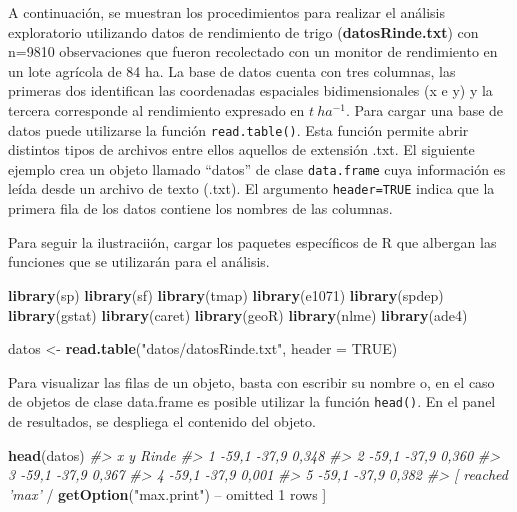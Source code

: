 \documentclass[11pt,b5paper,]{krantz}
\newenvironment{Shaded}{}{}
\newcommand{\CommentTok}[1]{\textcolor[rgb]{0.38,0.63,0.69}{\textit{#1}}}
\newcommand{\DataTypeTok}[1]{\textcolor[rgb]{0.56,0.13,0.00}{#1}}
\newcommand{\DecValTok}[1]{\textcolor[rgb]{0.25,0.63,0.44}{#1}}
\newcommand{\KeywordTok}[1]{\textcolor[rgb]{0.00,0.44,0.13}{\textbf{#1}}}
\newcommand{\NormalTok}[1]{#1}
\newcommand{\OperatorTok}[1]{\textcolor[rgb]{0.40,0.40,0.40}{#1}}
\newcommand{\OtherTok}[1]{\textcolor[rgb]{0.00,0.44,0.13}{#1}}
\newcommand{\StringTok}[1]{\textcolor[rgb]{0.25,0.44,0.63}{#1}}
\begin{document}
A continuación, se muestran los procedimientos para realizar el análisis exploratorio utilizando datos de rendimiento de trigo (\textbf{datosRinde.txt}) con n=9810 observaciones que fueron recolectado con un monitor de rendimiento en un lote agrícola de 84 ha. La base de datos cuenta con tres columnas, las primeras dos identifican las coordenadas espaciales bidimensionales (x e y) y la tercera corresponde al rendimiento expresado en \(t\ ha^{-1}\).
Para cargar una base de datos puede utilizarse la función \texttt{read.table()}. Esta función permite abrir distintos tipos de archivos entre ellos aquellos de extensión .txt. El siguiente ejemplo crea un objeto llamado ``datos'' de clase \texttt{data.frame} cuya información es leída desde un archivo de texto (.txt). El argumento \texttt{header=TRUE} indica que la primera fila de los datos contiene los nombres de las columnas.

Para seguir la ilustraciión, cargar los paquetes específicos de R que albergan las funciones que se utilizarán para el análisis.

\begin{Shaded}
\begin{Highlighting}[]
\KeywordTok{library}\NormalTok{(sp)}
\KeywordTok{library}\NormalTok{(sf)}
\KeywordTok{library}\NormalTok{(tmap)}
\KeywordTok{library}\NormalTok{(e1071)}
\KeywordTok{library}\NormalTok{(spdep)}
\KeywordTok{library}\NormalTok{(gstat)}
\KeywordTok{library}\NormalTok{(caret)}
\KeywordTok{library}\NormalTok{(geoR)}
\KeywordTok{library}\NormalTok{(nlme)}
\KeywordTok{library}\NormalTok{(ade4)}
\end{Highlighting}
\end{Shaded}

\begin{Shaded}
\begin{Highlighting}[]
\NormalTok{datos <-}\StringTok{ }\KeywordTok{read.table}\NormalTok{(}\StringTok{"datos/datosRinde.txt"}\NormalTok{, }
                    \DataTypeTok{header =} \OtherTok{TRUE}\NormalTok{)}
\end{Highlighting}
\end{Shaded}

Para visualizar las filas de un objeto, basta con escribir su nombre o, en el caso de objetos de clase data.frame es posible utilizar la función \texttt{head()}. En el panel de resultados, se despliega el contenido del objeto.

\begin{Shaded}
\begin{Highlighting}[]
\KeywordTok{head}\NormalTok{(datos)}
\CommentTok{#> x y Rinde}
\CommentTok{#> 1 -59,1 -37,9 0,348}
\CommentTok{#> 2 -59,1 -37,9 0,360}
\CommentTok{#> 3 -59,1 -37,9 0,367}
\CommentTok{#> 4 -59,1 -37,9 0,001}
\CommentTok{#> 5 -59,1 -37,9 0,382}
\CommentTok{#> [ reached 'max'}
    \OperatorTok{/}\StringTok{ }\KeywordTok{getOption}\NormalTok{(}\StringTok{"max.print"}\NormalTok{) }\OperatorTok{--}
\NormalTok{omitted }\DecValTok{1}\NormalTok{ rows ]}
\end{Highlighting}
\end{Shaded}
\end{document}
